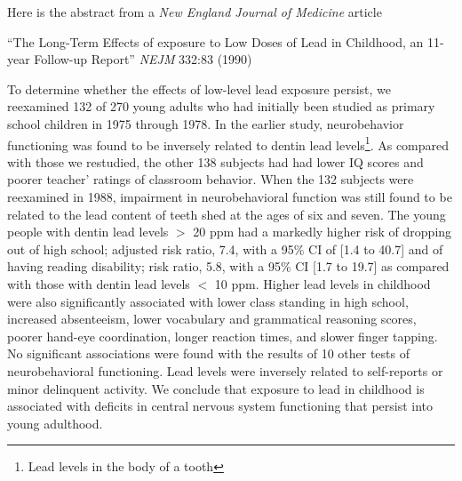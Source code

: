 
Here is the abstract from a {\em New England Journal of Medicine} article 

``The Long-Term Effects of exposure to Low Doses of Lead in Childhood, an 11-year Follow-up Report'' {\em NEJM} 332:83 (1990)

\noindent To determine whether the effects of low-level lead exposure persist, we reexamined 132 of 270 young adults who had initially been studied as primary school children in 1975 through 1978.  In the earlier study, neurobehavior functioning was found to be inversely related to dentin lead levels\footnote{Lead levels in the body of a tooth}.  As compared with those we restudied, the other 138 subjects had had lower IQ scores and poorer teacher' ratings of classroom behavior.  When the 132 subjects were reexamined in 1988, impairment in neurobehavioral function was still found to be related to the lead content of teeth shed at the ages of six and seven.  The young people with dentin lead levels $>$ 20 ppm had a markedly higher risk of dropping out of high school; adjusted risk ratio, 7.4,  with a 95\% CI of [1.4 to 40.7] and of having reading disability; risk ratio, 5.8, with a 95\% CI [1.7 to 19.7] as compared with those with dentin lead levels $<$ 10 ppm.  Higher lead levels in childhood were also significantly associated with lower class standing in high school, increased absenteeism, lower vocabulary and grammatical reasoning scores, poorer hand-eye coordination, longer reaction times, and slower finger tapping.  No significant associations were found with the results of 10 other tests of neurobehavioral functioning.  Lead levels were inversely related to self-reports or minor delinquent activity.  We conclude that exposure to lead in childhood is associated with deficits in central nervous system functioning that persist into young adulthood.

